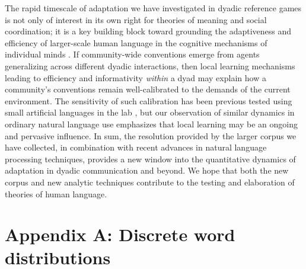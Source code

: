 \documentclass[alpha-refs]{wiley-article}
\begin{document}
The rapid timescale of adaptation we have investigated in dyadic reference games is not only of interest in its own right for theories of meaning and social coordination; it is a key building block toward grounding the adaptiveness and efficiency of larger-scale human language in the cognitive mechanisms of individual minds \citep{KirbyTamarizCornishSmith15_CompressionCommunication,gibson2019efficiency}.
If community-wide conventions emerge from agents generalizing across different dyadic interactions, then local learning mechanisms leading to efficiency and informativity \emph{within} a dyad may explain how a community's conventions remain well-calibrated to the demands of the current environment.
The sensitivity of such calibration has been previous tested using small artificial languages in the lab \cite[e.g.][]{WintersKirbySmith14_LanguagesAdapt,hawkins_emerging_abstractions_2018}, but our observation of similar dynamics in ordinary natural language use emphasizes that local learning may be an ongoing and pervasive influence.
In sum, the resolution provided by the larger corpus we have collected, in combination with recent advances in natural language processing techniques, provides a new window into the quantitative dynamics of adaptation in dyadic communication and beyond.
We hope that both the new corpus and new analytic techniques contribute to the testing and elaboration of theories of human language.

%

\printendnotes



\section*{Appendix A: Discrete word distributions}
\end{document}
